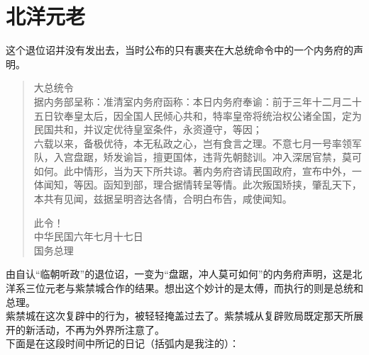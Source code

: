 \fancyhead[RO]{} %
\fancyhead[LE]{} %
\chapter*{北洋元老}
\thispagestyle{empty}
这个退位诏并没有发出去，当时公布的只有裹夹在大总统命令中的一个内务府的声明。\\

\begin{quote}
	大总统令\\

据内务部呈称：准清室内务府函称：本日内务府奉谕：前于三年十二月二十五日钦奉皇太后，因全国人民倾心共和，特率皇帝将统治权公诸全国，定为民国共和，并议定优待皇室条件，永资遵守，等因；\\

六载以来，备极优待，本无私政之心，岂有食言之理。不意七月一号率领军队，入宫盘踞，矫发谕旨，擅更国体，违背先朝懿训。冲入深居官禁，莫可如何。此中情形，当为天下所共谅。著内务府咨请民国政府，宣布中外，一体闻知，等因。函知到部，理合据情转呈等情。此次叛国矫挟，肇乱天下，本共有见闻，兹据呈明咨达各情，合明白布告，咸使闻知。\\

\begin{flushright}
	此令！\\

中华民国六年七月十七日\\

国务总理
\end{flushright}
\end{quote}

由自认“临朝听政”的退位诏，一变为“盘踞，冲人莫可如何”的内务府声明，这是北洋系三位元老与紫禁城合作的结果。想出这个妙计的是太傅，而执行的则是总统和总理。\\

紫禁城在这次复辟中的行为，被轻轻掩盖过去了。紫禁城从复辟败局既定那天所展开的新活动，不再为外界所注意了。\\

下面是在这段时间中所记的日记（括弧内是我注的）：\\

